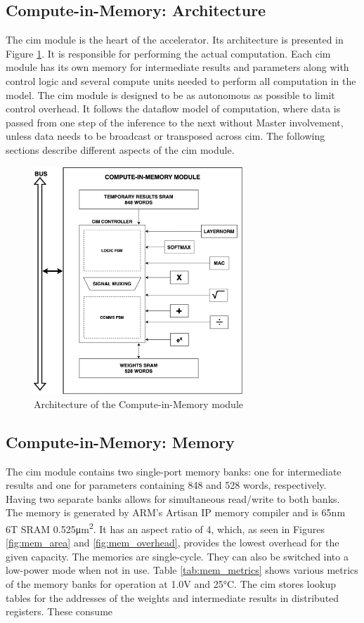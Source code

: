 \subsection{Compute-in-Memory: Architecture}
The \ac{cim} module is the heart of the accelerator. Its architecture is presented in Figure \ref{fig:cim_arch}. It is responsible for performing the actual computation. Each \ac{cim}
module has its own memory for intermediate results and parameters along with control logic and several compute units needed to perform all computation in the model. The \ac{cim} module
is designed to be as autonomous as possible to limit control overhead. It follows the dataflow model of computation, where data is passed from one step of the inference to the next without
Master involvement, unless data needs to be broadcast or transposed across \ac{cim}. The following sections describe different aspects of the \ac{cim} module.
\begin{figure}
    \centering
    \includegraphics[width=0.7\textwidth]{assets/cim_arch.png}
    \caption{Architecture of the Compute-in-Memory module}
    \label{fig:cim_arch}
\end{figure}

\subsection{Compute-in-Memory: Memory}
The \ac{cim} module contains two single-port memory banks: one for intermediate results and one for parameters containing 848 and 528 words, respectively. Having two separate banks
allows for simultaneous read/write to both banks. The memory is generated by ARM's Artisan IP memory compiler and is 65nm 6T SRAM 0.525\si{\square\micro\meter}. It has an aspect ratio of
4, which, as seen in Figures \ref{fig:mem_area} and \ref{fig:mem_overhead}, provides the lowest overhead for the given capacity. The memories are single-cycle. They can also be switched
into a low-power mode when not in use. Table \ref{tab:mem_metrics} shows various metrics of the memory banks for operation at 1.0V and 25\si{\degreeCelsius}.  The \ac{cim} stores lookup
tables for the addresses of the weights and intermediate results in distributed registers. These consume 

